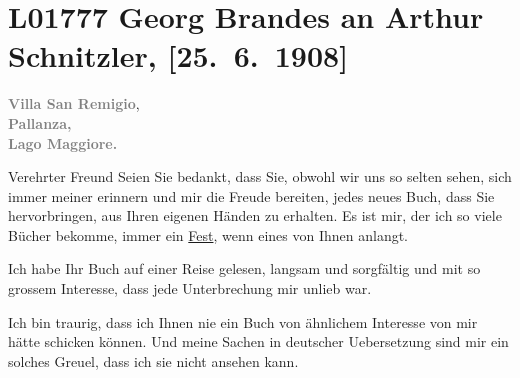 

\section[Georg Brandes an Arthur Schnitzler, {[}25. 6. 1908{]}]{L01777 Georg Brandes an Arthur Schnitzler, {[}25. 6. 1908{]}}
\nopagebreak{}
\rehead{ }\normalsize\beginnumbering{}
\toendnotes[C]{\smallbreak\pagebreak[2]}
\toendnotes[C]{\smallbreak}
\pstart
           {\pb}\textcolor{gray}{\textbf{Villa San Remigio}}, {\\}\textcolor{gray}{\textbf{Pallanza,}}{\\}\textcolor{gray}{\textbf{Lago Maggiore.}}\pend
           
\pstart{}Verehrter Freund\pend\vspace{0.5em}
\pstart
           Seien Sie bedankt, dass Sie, obwohl wir uns so selten sehen, sich immer meiner
               erinnern und mir die Freude bereiten, jedes neues Buch, dass Sie hervorbringen, aus
               Ihren eigenen Händen zu erhalten. Es ist mir, der ich so viele Bücher bekomme, immer
               ein \uline{Fest}, wenn eines von Ihnen anlangt.\pend
           
\pstart
           Ich habe Ihr Buch auf einer
               Reise gelesen, langsam und sorgfältig und mit so grossem Interesse, dass jede
               Unterbrechung mir unlieb war.\pend
           
\pstart
           {\pb}Ich bin traurig, dass ich Ihnen
               nie ein Buch von ähnlichem Interesse von mir hätte schicken können. Und meine Sachen
               in deutscher Uebersetzung sind mir ein solches Greuel, dass ich sie nicht ansehen
               kann.\pend
           
